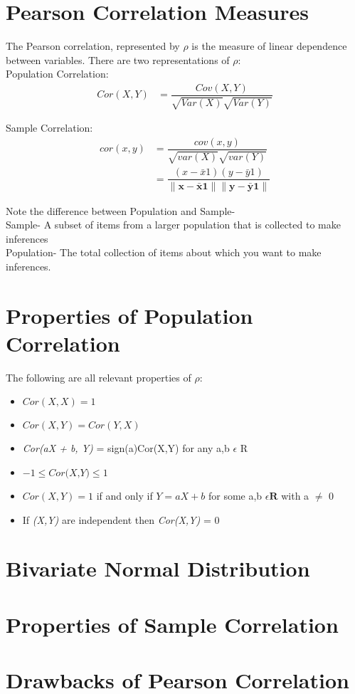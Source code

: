 \documentclass[11pt]{article}
\begin{document}
\section{Pearson Correlation Measures}

The Pearson correlation, represented by \(\rho\) is the measure of linear dependence between variables.
There are two representations of \(\rho\): \\

Population Correlation:
\begin{align}
Cor(X,Y)
&= \dfrac{Cov(X,Y)}{\sqrt{Var(X)}\sqrt{Var(Y)}}
\end{align}

Sample Correlation:
\begin{align}
cor(x,y)
&= \dfrac{cov(x,y)}{\sqrt{var(X)}\sqrt{var(Y)}} \\
&= \dfrac{(x - \bar{x}1)(y - \bar{y}1)}{\| \mathbf{x - \bar{x}1} \|\| \mathbf{y - \bar{y}1} \|}
\end{align}

Note the difference between Population and Sample- \\
Sample- A subset of items from a larger population that is collected to make inferences \\
Population- The total collection of items about which you want to make inferences.



\section{Properties of Population Correlation}
The following are all relevant properties of \(\rho\):

\begin{itemize}
\item $Cor(X,X) = 1$
\item $Cor(X,Y) = Cor(Y,X)$
\item \textit{Cor(aX + b, Y)} = sign(a)Cor(X,Y) for any a,b $\epsilon$ R
\item $-1 \leq \textit{Cor(X,Y)}  \leq 1 $
\item $Cor(X,Y)  =  1$ if and only if $Y = aX + b$ for some a,b $\epsilon \mathbf{R}$ with a $\neq$ 0 
\item If  \textit{(X,Y)} are independent then \textit{Cor(X,Y)} = 0



\end{itemize}

\section{Bivariate Normal Distribution}
\section{Properties of Sample Correlation}
\section{Drawbacks of Pearson Correlation}
\end{document}
